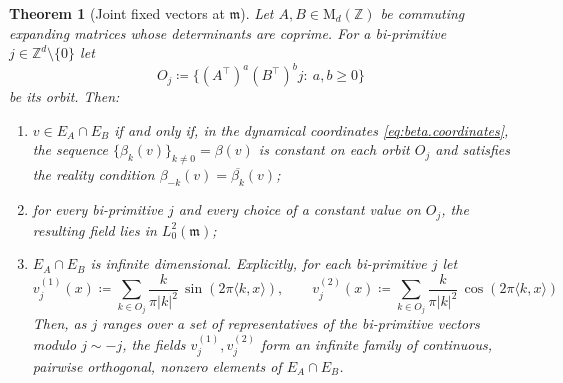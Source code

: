 \documentclass[11pt,reqno]{amsart}
\theoremstyle{plain}
\newtheorem{thm}{Theorem}[section]
\theoremstyle{definition}
\newcommand{\Z}{\mathbb{Z}}
\newcommand{\Leb}{\mathfrak{m}}
\begin{document}
\begin{thm}[Joint fixed vectors at \( \Leb \)]
    \label{thm:joint.eigen}
    Let \( A,B\in \mathrm{M}_d(\Z) \) be commuting expanding matrices whose determinants are coprime.
    For a bi-primitive \( j\in\Z^d\setminus\{0\} \) let
    \[
        O_j\coloneqq \big\{(A^{\top})^{a}(B^{\top})^{b}j:\ a,b\ge0\big\}
    \]
    be its orbit.
    Then:
    \begin{enumerate}
        \item\label{item:char}
              \( v\in E_A\cap E_B \) if and only if, in the dynamical coordinates \eqref{eq:beta.coordinates}, the sequence \( \{\beta_k(v)\}_{k\neq0} = \beta(v) \) is constant on each orbit \( O_j \) and satisfies the reality condition \( \beta_{-k}(v)=\overline{\beta_k}(v) \);
        \item\label{item:conv}
              for every bi-primitive \( j \) and every choice of a constant value on \( O_j \), the resulting field lies in \( L^2_0(\Leb) \); 
        \item\label{item:infinite}
              \( E_A\cap E_B \) is infinite dimensional.
              Explicitly, for each bi-primitive \( j \) let
              \[
                  v_j^{(1)}(x)\coloneqq \sum_{k\in O_j}\frac{k}{\pi\lvert k \rvert^{2}}\,
                  \sin\!\left(2\pi\langle k,x\rangle\right),\qquad v_j^{(2)}(x)\coloneqq \sum_{k\in O_j}\frac{k}{\pi\lvert k \rvert^{2}}\, \cos\!\left(2\pi\langle k,x\rangle\right)
              \]
              Then, as \( j \) ranges over a set of representatives of the bi-primitive vectors modulo \( j\sim-j \), the fields \( v_j^{(1)},v_j^{(2)} \) form an infinite family of continuous, pairwise orthogonal, nonzero elements of \( E_A\cap E_B \).
    \end{enumerate}
\end{thm}
\end{document}
